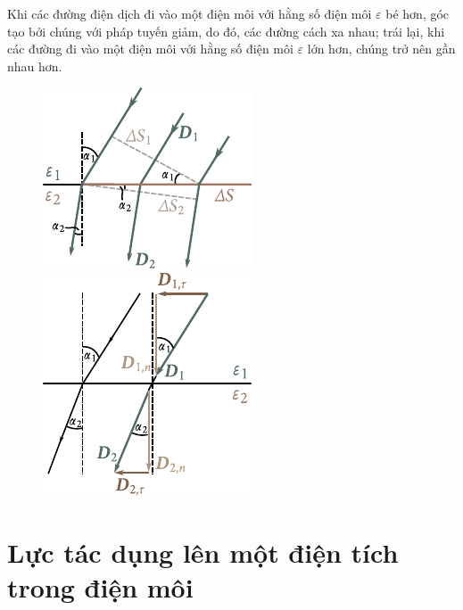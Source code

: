 \noindent
Khi các đường điện dịch đi vào một điện môi với hằng số điện môi $\varepsilon$ bé hơn, góc tạo bởi chúng với pháp tuyến giảm, do đó, các đường cách xa nhau; trái lại, khi các đường đi vào một điện môi với hằng số điện môi $\varepsilon$ lớn hơn, chúng trở nên gần nhau hơn.

\begin{figure}[!htb]
	\begin{minipage}[t]{0.48\linewidth}
		\begin{center}
			\includegraphics[scale=1.1]{figures/ch_02/fig_2_11.pdf}
			\caption[]{}
			\label{fig:2_11}
		\end{center}
	\end{minipage}
	\hfill{}%
	\begin{minipage}[t]{0.48\linewidth}
		\begin{center}
			\includegraphics[scale=1.1]{figures/ch_02/fig_2_12.pdf}
			\caption[]{}
			\label{fig:2_12}
		\end{center}
	\end{minipage}
\vspace{-0.4cm}
\end{figure}

\section{Lực tác dụng lên một điện tích trong điện môi}\label{sec:2_8}

